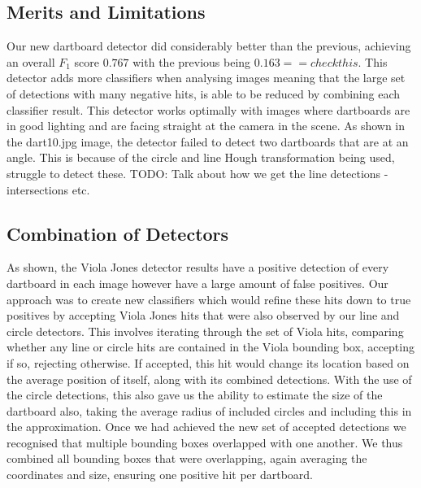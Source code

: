 \documentclass[a4paper]{article}
\begin{document}
\subsection*{Merits and Limitations}
\vspace{-0.7em}
Our new dartboard detector did considerably better than the previous, achieving
an overall \(F_{1}\) score ${0.767}$ with the previous being ${0.163 == check
this}$. This detector adds more classifiers when analysing images meaning that
the large set of detections with many negative hits, is able to be reduced by
combining each classifier result. This detector works optimally with images
where dartboards are in good lighting and are facing straight at the camera in
the scene. As shown in the dart10.jpg image, the detector failed to detect two
dartboards that are at an angle. This is because of the circle and line Hough
transformation being used, struggle to detect these.
TODO: Talk about how we get the line detections - intersections etc.

\subsection*{Combination of Detectors}
\begin{figure}[H]
  \centering
\end{figure}

As shown, the Viola Jones detector results have a positive detection of every
dartboard in each image however have a large amount of false positives. Our
approach was to create new classifiers which would refine these hits down to
true positives by accepting Viola Jones hits that were also observed by our
line and circle detectors. This involves iterating through the set of Viola
hits, comparing whether any line or circle hits are contained in the Viola
bounding box, accepting if so, rejecting otherwise. If accepted, this hit would
change its location based on the average position of itself, along with its
combined detections. With the use of the circle detections, this also gave us
the ability to estimate the size of the dartboard also, taking the average
radius of included circles and including this in the approximation.  Once we
had achieved the new set of accepted detections we recognised that multiple
bounding boxes overlapped with one another. We thus combined all bounding boxes
that were overlapping, again averaging the coordinates and size, ensuring one
positive hit per dartboard.
\end{document}
